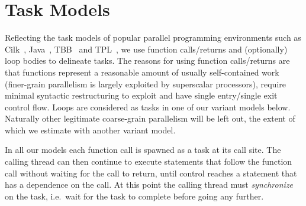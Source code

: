 \section{Task Models} \label{smethod}

Reflecting the task models of popular parallel programming environments such as Cilk~\cite{blumofe96cilk},
Java~\cite{lea00java}, TBB~\cite{reinders07intel} and TPL~\cite{leijen07parallel},
we use function calls/returns and (optionally) loop bodies to delineate tasks.
The reasons for using function calls/returns are that functions represent a reasonable amount of usually self-contained work (finer-grain parallelism is largely exploited by superscalar processors), require minimal syntactic restructuring to exploit and have single entry/single exit control flow.
Loops are considered as tasks in one of our variant models below.
Naturally other legitimate coarse-grain parallelism will be left out,
the extent of which we estimate with another variant model.

In all our models each function call is spawned as a task at its call site.
The calling thread can then continue to execute statements that follow the function call without waiting for the call to return,
until control reaches a statement that has a dependence on the call.
At this point the calling thread must \emph{synchronize} on the task,
i.e.\ wait for the task to complete before going any further.

